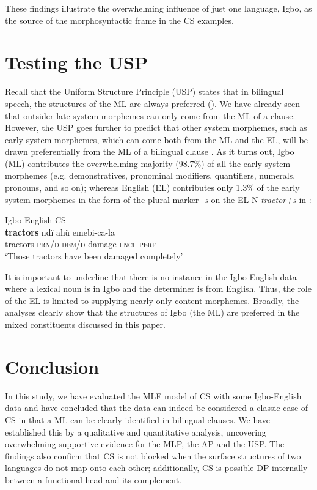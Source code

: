 \documentclass[output=paper]{langsci/langscibook}
\begin{document}
 

These findings illustrate the overwhelming influence of just one language, Igbo, as the source of the morphosyntactic frame in the CS examples. 

\section{Testing the USP}

Recall that the Uniform Structure Principle (USP) states that in bilingual speech, the structures of the ML are always preferred (). We have already seen that outsider late system morphemes can only come from the ML of a clause. However, the USP goes further to predict that other system morphemes, such as early system morphemes, which can come both from the ML and the EL, will be drawn preferentially from the ML of a bilingual clause \citep[8-9]{MyersScotton2002}. As it turns out, Igbo (ML) contributes the overwhelming majority (98.7\%) of all the early system morphemes (e.g. demonstratives, pronominal modifiers, quantifiers, numerals, pronouns, and so on); whereas English (EL) contributes only 1.3\% of the early system morphemes in the form of the plural marker \textit{-s} on the EL N \textit{tractor+s} in : 

\ea
{Igbo-English CS}\\
\gll \textbf{tractors}  ndï    ahü  emebi-ca-la\\
     tractors  \textsc{prn/d}\textsubscript{}    \textsc{dem/d}  damage-\textsc{encl-perf}\textsubscript{} \\
\glt ‘Those tractors have been damaged completely’
\z

It is important to underline that there is no instance in the Igbo-English data where a lexical noun is in Igbo and the determiner is from English. Thus, the role of the EL is limited to supplying nearly only content morphemes. Broadly, the analyses clearly show that the structures of Igbo (the ML) are preferred in the mixed constituents discussed in this paper.

\section{Conclusion}

In this study, we have evaluated the MLF model of CS with some Igbo-English data and have concluded that the data can indeed be considered a classic case of CS in that a ML can be clearly identified in bilingual clauses. We have established this by a qualitative and quantitative analysis, uncovering overwhelming supportive evidence for the MLP, the AP and the USP. The findings also confirm that CS is not blocked when the surface structures of two languages do not map onto each other; additionally, CS is possible DP-internally between a functional head and its complement. 
\end{document}
